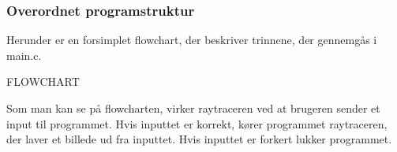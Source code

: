 \subsubsection{Overordnet programstruktur}
Herunder er en forsimplet flowchart, der beskriver trinnene, der gennemgås i main.c. 

FLOWCHART

Som man kan se på flowcharten, virker raytraceren ved at brugeren sender et input til programmet. Hvis inputtet er korrekt, kører programmet raytraceren, der laver et billede ud fra inputtet. Hvis inputtet er forkert lukker programmet.